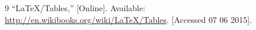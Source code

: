 \documentclass[a4paper,12pt]{report}
\numberwithin{equation}{chapter}
\renewcommand{\cftchappresnum}{Chương~}
\begin{document}
\clearpage{}
{}
\begingroup
\small\singlespacing
\begin{thebibliography}{9}
 ``LaTeX/Tables,'' [Online]. Available: \url{http://en.wikibooks.org/wiki/LaTeX/Tables}. [Accessed 07 06 2015].
\end{thebibliography}
\endgroup



\end{document}
